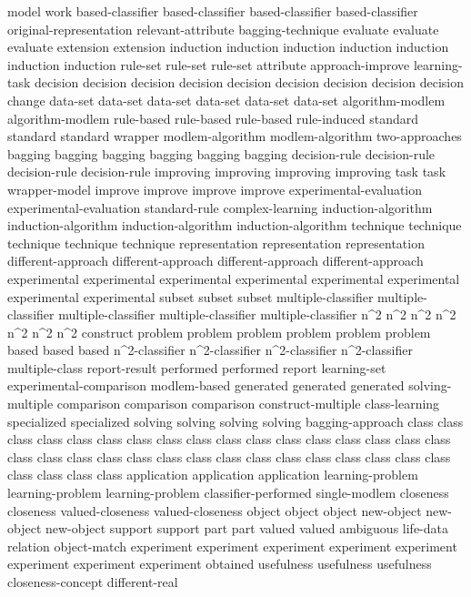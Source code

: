 model	
work	
based-classifier	based-classifier	based-classifier	based-classifier	
original-representation	
relevant-attribute	
bagging-technique	
evaluate	evaluate	evaluate	
extension	extension	
induction	induction	induction	induction	induction	induction	induction	
rule-set	rule-set	rule-set	
attribute	
approach-improve	
learning-task	
decision	decision	decision	decision	decision	decision	decision	decision	decision	
change	
data-set	data-set	data-set	data-set	data-set	data-set	
algorithm-modlem	algorithm-modlem	
rule-based	rule-based	rule-based	
rule-induced	
standard	standard	standard	
wrapper	
modlem-algorithm	modlem-algorithm	
two-approaches	
bagging	bagging	bagging	bagging	bagging	bagging	
decision-rule	decision-rule	decision-rule	decision-rule	
improving	improving	improving	improving	
task	task	
wrapper-model	
improve	improve	improve	improve	
experimental-evaluation	experimental-evaluation	
standard-rule	
complex-learning	
induction-algorithm	induction-algorithm	induction-algorithm	induction-algorithm	
technique	technique	technique	technique	technique	
representation	representation	representation	
different-approach	different-approach	different-approach	different-approach	
experimental	experimental	experimental	experimental	experimental	experimental	experimental	experimental	
subset	subset	subset	
multiple-classifier	multiple-classifier	multiple-classifier	multiple-classifier	multiple-classifier	
n^2	n^2	n^2	n^2	n^2	n^2	n^2	
construct	
problem	problem	problem	problem	problem	problem	
based	based	based	
n^2-classifier	n^2-classifier	n^2-classifier	n^2-classifier	
multiple-class	
report-result	
performed	performed	
report	
learning-set	
experimental-comparison	
modlem-based	
generated	generated	generated	
solving-multiple	
comparison	comparison	comparison	
construct-multiple	
class-learning	
specialized	specialized	
solving	solving	solving	solving	
bagging-approach	
class	class	class	class	class	class	class	class	class	class	class	class	class	class	class	class	class	class	class	class	class	class	class	class	class	class	class	class	class	class	class	class	class	class	class	class	
application	application	application	
learning-problem	learning-problem	learning-problem	
classifier-performed	
single-modlem	
closeness	closeness	
valued-closeness	valued-closeness	
object	object	object	
new-object	new-object	new-object	
support	support	
part	part	
valued	valued	
ambiguous	
life-data	
relation	
object-match	
experiment	experiment	experiment	experiment	experiment	experiment	experiment	experiment	
obtained	
usefulness	usefulness	usefulness	
closeness-concept	
different-real	
